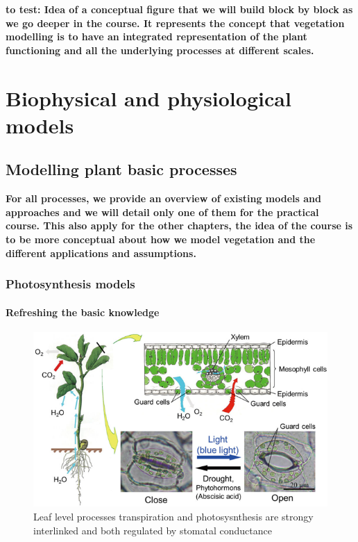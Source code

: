 \documentclass[
  oneside]{book}
\begin{document}
\textbf{to test: Idea of a conceptual figure that we will build block by block as we go deeper in the course. It represents the concept that vegetation modelling is to have an integrated representation of the plant functioning and all the underlying processes at different scales. }

\hypertarget{part-biophysical-and-physiological-models}{%
\part{Biophysical and physiological models}\label{part-biophysical-and-physiological-models}}

\hypertarget{modelling-plant-basic-processes}{%
\chapter{Modelling plant basic processes}\label{modelling-plant-basic-processes}}


\textbf{For all processes, we provide an overview of existing models and approaches and we will detail only one of them for the practical course. This also apply for the other chapters, the idea of the course is to be more conceptual about how we model vegetation and the different applications and assumptions.}

\hypertarget{photosynthesis-models}{%
\section{Photosynthesis models}\label{photosynthesis-models}}

\hypertarget{refreshing-the-basic-knowledge}{%
\subsection{Refreshing the basic knowledge}\label{refreshing-the-basic-knowledge}}

\begin{figure}

{\centering \includegraphics[width=0.8\linewidth]{figures/chap2/leaf_level_processes} 

}

\caption{Leaf level processes transpiration and photosysnthesis are strongy interlinked and both regulated by stomatal conductance}\label{fig:f21}
\end{figure}
\end{document}
